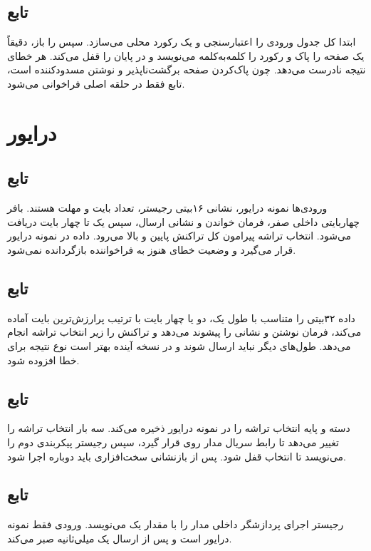 \subsection{تابع }
ابتدا کل جدول ورودی را اعتبارسنجی و یک رکورد محلی می‌سازد. سپس
را باز، دقیقاً یک صفحه را پاک و رکورد را کلمه‌به‌کلمه می‌نویسد و در پایان
را قفل می‌کند. هر خطای
نتیجه نادرست می‌دهد. چون پاک‌کردن صفحه برگشت‌ناپذیر و نوشتن مسدودکننده است، تابع فقط در حلقه اصلی فراخوانی می‌شود.

\section{درایور }


\subsection{تابع }
ورودی‌ها نمونه درایور، نشانی ۱۶بیتی رجیستر، تعداد بایت و مهلت
هستند. بافر چهار‌بایتی داخلی صفر، فرمان خواندن و نشانی ارسال، سپس یک تا چهار بایت دریافت می‌شود. انتخاب تراشه پیرامون کل تراکنش پایین و بالا می‌رود. داده در
نمونه درایور قرار می‌گیرد و وضعیت خطای
هنوز به فراخواننده بازگردانده نمی‌شود.

\subsection{تابع }
داده ۳۲بیتی را متناسب با طول یک، دو یا چهار بایت با ترتیب پرارزش‌ترین بایت آماده می‌کند، فرمان نوشتن و نشانی را پیشوند می‌دهد و تراکنش
را زیر انتخاب تراشه انجام می‌دهد. طول‌های دیگر نباید ارسال شوند و در نسخه آینده بهتر است نوع نتیجه برای خطا افزوده شود.

\subsection{تابع }
دسته
و پایه انتخاب تراشه را در نمونه درایور ذخیره می‌کند. سه بار انتخاب تراشه را تغییر می‌دهد تا رابط سریال مدار روی
قرار گیرد، سپس رجیستر پیکربندی دوم را می‌نویسد تا انتخاب قفل شود. پس از بازنشانی سخت‌افزاری باید دوباره اجرا شود.

\subsection{تابع }
رجیستر اجرای پردازشگر داخلی مدار را با مقدار یک می‌نویسد. ورودی فقط نمونه درایور است و پس از ارسال یک میلی‌ثانیه صبر می‌کند.


